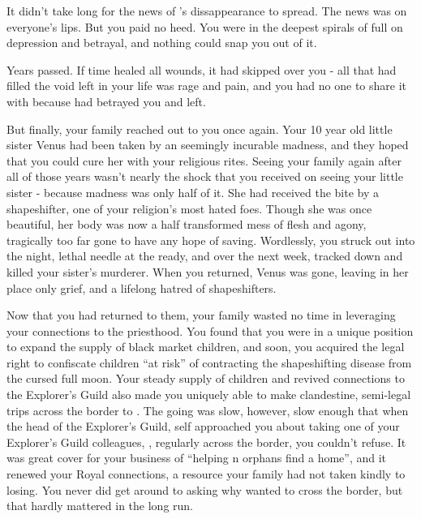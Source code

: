 \documentclass[char]{NeptuneBall}
\begin{document}
It didn't take long for the news of \cAriel{}'s dissappearance to spread. The news was on everyone's lips. But you paid no heed. You were in the deepest spirals of full on depression and betrayal, and nothing could snap you out of it.

Years passed. If time healed all wounds, it had skipped over you - all that had filled the void left in your life was rage and pain, and you had no one to share it with because \emph{\cAriel{\they}} had betrayed you and left.

But finally, your family reached out to you once again. Your 10 year old little sister Venus had been taken by an seemingly incurable madness, and they hoped that you could cure her with your religious rites. Seeing your family again after all of those years wasn't nearly the shock that you received on seeing your little sister - because madness was only half of it. She had received the bite by a shapeshifter, one of your religion's most hated foes. Though she was once beautiful, her body was now a half transformed mess of flesh and agony, tragically too far gone to have any hope of saving. Wordlessly, you struck out into the night, lethal needle at the ready, and over the next week, tracked down and killed your sister's murderer. When you returned, Venus was gone, leaving in her place only grief, and a lifelong hatred of shapeshifters.

Now that you had returned to them, your family wasted no time in leveraging your connections to the priesthood. You found that you were in a unique position to expand the supply of black market children, and soon, you acquired the legal right to confiscate children ``at risk'' of contracting the shapeshifting disease from the cursed full moon. Your steady supply of children and revived connections to the Explorer's Guild also made you uniquely able to make clandestine, semi-legal trips across the border to \pPacifica{}. The going was slow, however, slow enough that when the head of the Explorer's Guild, \cPlant{\Prince} \cPlant{} \cPlant{\them}self approached you about taking one of your Explorer's Guild colleagues, \cPlant{\their} \cPrincess{\nephew}, \cPrincess{\Prince} \cPrincess{} regularly across the border, you couldn't refuse. It was great cover for your business of ``helping \pAtlantis{}n orphans find a home'', and it renewed your Royal connections, a resource your family had not taken kindly to losing. You never did get around to asking why \cPrincess{\they} wanted to cross the border, but that hardly mattered in the long run.
\end{document}
